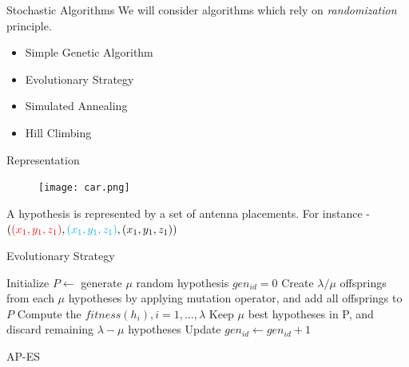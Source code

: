 \documentclass{beamer}
\begin{document}
    \begin{frame}[t]{Stochastic Algorithms}
        We will consider algorithms which rely on \textit{randomization} principle.
        \vspace{10px}
    \begin{itemize} \itemsep1.5em
            \item Simple Genetic Algorithm
            \item Evolutionary Strategy
            \item Simulated Annealing
            \item Hill Climbing
        \end{itemize}
    \end{frame}


    \begin{frame}[t]{Representation}
        \begin{figure}
            \centering
            \texttt{[image: car.png]}
        \end{figure}
        A hypothesis is represented by a set of antenna placements. For instance - $(\textcolor{red}{(x_1, y_1, z_1)}, \textcolor{cyan}{(x_1, y_1, z_1)}, \textcolor{black}{(x_1, y_1, z_1)})$
    \end{frame}

    \begin{frame}[t]{Evolutionary Strategy}
        \fontsize{8}{12}\selectfont
        \begin{algorithm}[H]
            Initialize $P\leftarrow$ generate $\mu$ random hypothesis \;
            $gen_{id}=0$ \;
             {
                Create $\lambda / \mu$ offsprings from  each $\mu$ hypotheses by applying mutation operator, and add all offsprings to $P$ \;
                Compute the $fitness(h_i), i=1,\ldots, \lambda$ \;
                Keep $\mu$ best hypotheses in P, and discard remaining $\lambda - \mu$ hypotheses \;
                Update $gen_{id} \leftarrow gen_{id}+1$
            }
            \caption{AP-ES}
        \end{algorithm}
    \end{frame}
\end{document}
